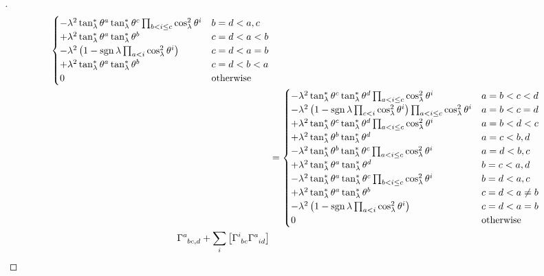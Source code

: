 \documentclass[../main.tex]{subfiles}
\begin{document}
\begin{proof}[]
\begin{align*}
\begin{cases}
-\lambda^2\tan_\lambda^\ast\tensor{\theta}{^a}\tan_\lambda^\ast\tensor{\theta}{^c}\prod_{b<i\le c}\cos_\lambda^2\tensor{\theta}{^i}
&\text{$b=d<a,c$}\\
+\lambda^2\tan_\lambda^\ast\tensor{\theta}{^a}\tan_\lambda^\ast\tensor{\theta}{^b}
&\text{$c=d<a<b$}\\
-\lambda^2
\left(
1-\sign{\lambda}\prod_{a<i}\cos_\lambda^2\tensor{\theta}{^i}
\right)
&\text{$c=d<a=b$}\\
+\lambda^2\tan_\lambda^\ast\tensor{\theta}{^a}\tan_\lambda^\ast\tensor{\theta}{^b}
&\text{$c=d<b<a$}\\
0&\text{otherwise}\\
\end{cases}\\
&=\begin{cases}
-\lambda^2\tan_\lambda^\ast\tensor{\theta}{^c}\tan_\lambda^\ast\tensor{\theta}{^d}\prod_{a<i\le c}\cos_\lambda^2\tensor{\theta}{^i}
&\text{$a=b<c<d$}\\
-\lambda^2
\left(
1-\sign{\lambda}\prod_{c<i}\cos_\lambda^2\tensor{\theta}{^i}
\right)
\prod_{a<i\le c}\cos_\lambda^2\tensor{\theta}{^i}
&\text{$a=b<c=d$}\\
+\lambda^2\tan_\lambda^\ast\tensor{\theta}{^c}\tan_\lambda^\ast\tensor{\theta}{^d}\prod_{a<i\le c}\cos_\lambda^2\tensor{\theta}{^i}
&\text{$a=b<d<c$}\\
+\lambda^2\tan_\lambda^\ast\tensor{\theta}{^b}\tan_\lambda^\ast\tensor{\theta}{^d}
&\text{$a=c<b,d$}\\
-\lambda^2\tan_\lambda^\ast\tensor{\theta}{^b}\tan_\lambda^\ast\tensor{\theta}{^c}\prod_{a<i\le c}\cos_\lambda^2\tensor{\theta}{^i}
&\text{$a=d<b,c$}\\
+\lambda^2\tan_\lambda^\ast\tensor{\theta}{^a}\tan_\lambda^\ast\tensor{\theta}{^d}
&\text{$b=c<a,d$}\\
-\lambda^2\tan_\lambda^\ast\tensor{\theta}{^a}\tan_\lambda^\ast\tensor{\theta}{^c}\prod_{b<i\le c}\cos_\lambda^2\tensor{\theta}{^i}
&\text{$b=d<a,c$}\\
+\lambda^2\tan_\lambda^\ast\tensor{\theta}{^a}\tan_\lambda^\ast\tensor{\theta}{^b}
&\text{$c=d<a\ne b$}\\
-\lambda^2
\left(
1-\sign{\lambda}\prod_{a<i}\cos_\lambda^2\tensor{\theta}{^i}
\right)
&\text{$c=d<a=b$}\\
0&\text{otherwise}\\
\end{cases}\\
\tensor{\Gamma}{^a_b_c_{,d}}
+\sum_{i}\left[\tensor{\Gamma}{^i_b_c}\tensor{\Gamma}{^a_i_d}\right]

\end{align*}
\end{proof}
\end{document}

